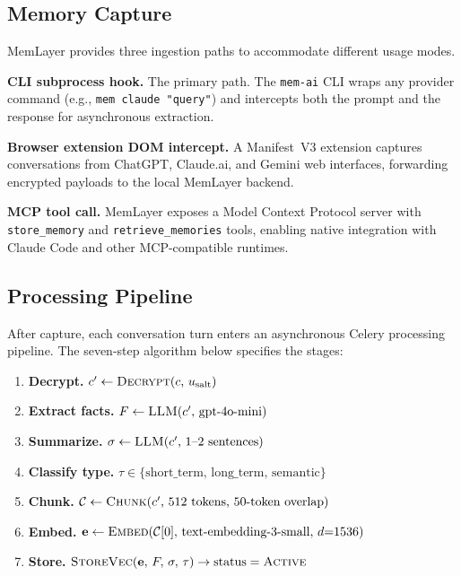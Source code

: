 \documentclass[10pt,twocolumn]{article}
\begin{document}
\subsection{Memory Capture}

\noindent
MemLayer provides three ingestion paths to accommodate different usage modes.

\textbf{CLI subprocess hook.} The primary path. The \texttt{mem-ai} CLI wraps
any provider command (e.g., \texttt{mem claude "query"}) and intercepts both
the prompt and the response for asynchronous extraction.

\textbf{Browser extension DOM intercept.} A Manifest~V3 extension captures
conversations from ChatGPT, Claude.ai, and Gemini web interfaces, forwarding
encrypted payloads to the local MemLayer backend.

\textbf{MCP tool call.} MemLayer exposes a Model Context Protocol server with
\texttt{store\_memory} and \texttt{retrieve\_memories} tools, enabling native
integration with Claude Code and other MCP-compatible runtimes.

\subsection{Processing Pipeline}

\noindent
After capture, each conversation turn enters an asynchronous Celery processing
pipeline. The seven-step algorithm below specifies the stages:

\begin{enumerate}
  \item \textbf{Decrypt.} $c' \leftarrow \textsc{Decrypt}(c,\, u_{\text{salt}})$
  \item \textbf{Extract facts.} $F \leftarrow \textsc{LLM}(c',\, \text{gpt-4o-mini})$
  \item \textbf{Summarize.} $\sigma \leftarrow \textsc{LLM}(c',\, \text{1--2 sentences})$
  \item \textbf{Classify type.} $\tau \in \{\text{short\_term, long\_term, semantic}\}$
  \item \textbf{Chunk.} $\mathcal{C} \leftarrow \textsc{Chunk}(c',\, 512\text{ tokens},\, 50\text{-token overlap})$
  \item \textbf{Embed.} $\mathbf{e} \leftarrow \textsc{Embed}(\mathcal{C}[0],\, \text{text-embedding-3-small},\, d{=}1536)$
  \item \textbf{Store.} $\textsc{StoreVec}(\mathbf{e},\, F,\, \sigma,\, \tau) \rightarrow \text{status} = \textsc{Active}$
\end{enumerate}
\end{document}
